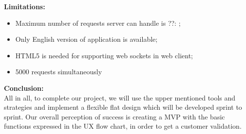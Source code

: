 \documentclass[12pt]{article}
\begin{document}
\textbf{Limitations:}
\begin{itemize}
\item Maximum number of requests server can handle is ??: ;
\item Only English version of application is available;
\item HTML5 is needed for supporting web sockets in web client;
\item 5000 requests simultaneously
\end{itemize}

\textbf{Conclusion:}\\
All in all, to complete our project, we will use the upper mentioned tools and strategies and implement a flexible flat design which will be developed sprint to sprint. Our overall perception of success is creating a MVP with the basic functions expressed in the UX flow chart, in order to get a customer validation.
\end{document}
